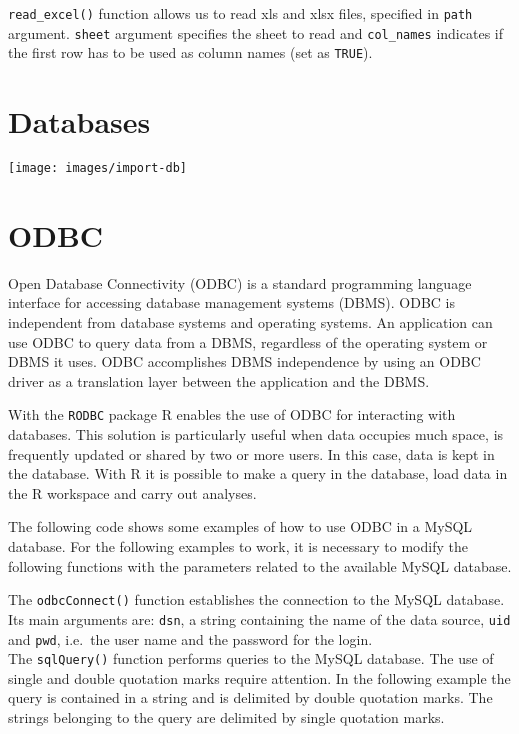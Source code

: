 \documentclass[]{book}
\begin{document}
\texttt{read\_excel()} function allows us to read xls and xlsx files,
specified in \texttt{path} argument. \texttt{sheet} argument specifies
the sheet to read and \texttt{col\_names} indicates if the first row has
to be used as column names (set as \texttt{TRUE}).

\clearpage

\section{Databases}\label{databases}

\texttt{[image: images/import-db]}

\section{ODBC}\label{odbc}

Open Database Connectivity (ODBC) is a standard programming language
interface for accessing database management systems (DBMS). ODBC is
independent from database systems and operating systems. An application
can use ODBC to query data from a DBMS, regardless of the operating
system or DBMS it uses. ODBC accomplishes DBMS independence by using an
ODBC driver as a translation layer between the application and the DBMS.

With the \texttt{RODBC} package R enables the use of ODBC for
interacting with databases. This solution is particularly useful when
data occupies much space, is frequently updated or shared by two or more
users. In this case, data is kept in the database. With R it is possible
to make a query in the database, load data in the R workspace and carry
out analyses.

The following code shows some examples of how to use ODBC in a MySQL
database. For the following examples to work, it is necessary to modify
the following functions with the parameters related to the available
MySQL database.

The \texttt{odbcConnect()} function establishes the connection to the
MySQL database. Its main arguments are: \texttt{dsn}, a string
containing the name of the data source, \texttt{uid} and \texttt{pwd},
i.e.~the user name and the password for the login.\\
The \texttt{sqlQuery()} function performs queries to the MySQL database.
The use of single and double quotation marks require attention. In the
following example the query is contained in a string and is delimited by
double quotation marks. The strings belonging to the query are delimited
by single quotation marks.
\end{document}
